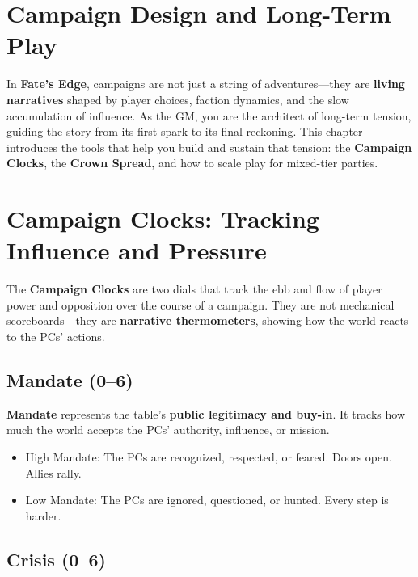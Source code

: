 
\section{Campaign Design and Long-Term Play}

In \textbf{Fate's Edge}, campaigns are not just a string of adventures---they are \textbf{living narratives} shaped by player choices, faction dynamics, and the slow accumulation of influence. As the GM, you are the architect of long-term tension, guiding the story from its first spark to its final reckoning. This chapter introduces the tools that help you build and sustain that tension: the \textbf{Campaign Clocks}, the \textbf{Crown Spread}, and how to scale play for mixed-tier parties.

\section*{Campaign Clocks: Tracking Influence and Pressure}

The \textbf{Campaign Clocks} are two dials that track the ebb and flow of player power and opposition over the course of a campaign. They are not mechanical scoreboards---they are \textbf{narrative thermometers}, showing how the world reacts to the PCs' actions.

\subsection*{Mandate (0--6)}

\textbf{Mandate} represents the table's \textbf{public legitimacy and buy-in}. It tracks how much the world accepts the PCs' authority, influence, or mission.

\begin{itemize}
    \item High Mandate: The PCs are recognized, respected, or feared. Doors open. Allies rally.
    \item Low Mandate: The PCs are ignored, questioned, or hunted. Every step is harder.
\end{itemize}

\subsection*{Crisis (0--6)}

